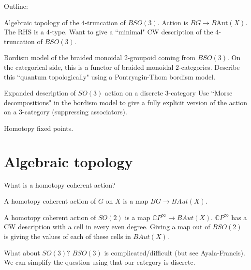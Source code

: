 \documentclass[beamer]{beamer}
\begin{document}
\begin{frame}{Outline:}
\begin{block}{Algebraic topology of the $4$-truncation of $BSO(3)$.}
Action is $BG \rightarrow B \mathrm{Aut}(X)$.  The RHS is a $4$-type.  Want to give a ``minimal" CW description of the $4$-truncation of $BSO(3)$.
\end{block}

\begin{block}{Bordism model of the braided monoidal $2$-groupoid coming from $BSO(3)$.}
On the categorical side, this is a functor of braided monoidal $2$-categories.  Describe this ``quantum topologically" using a Pontryagin-Thom bordism model.
\end{block}

\begin{block}{Expanded description of $SO(3)$ action on a discrete $3$-category}
Use ``Morse decompositions" in the bordism model to give a fully explicit version of the action on a $3$-category (suppressing associators).
\end{block}

\begin{block}{Homotopy fixed points.}
\end{block}
\end{frame}

\section{Algebraic topology}

\begin{frame}{What is a homotopy coherent action?}
\begin{definition}
A homotopy coherent action of $G$ on $X$ is a map $BG \rightarrow BAut(X)$.
\end{definition}

\begin{example}
A homotopy coherent action of $SO(2)$ is a map $\mathbb{C}P^\infty \rightarrow BAut(X)$.  $\mathbb{C}P^\infty$ has a CW description with a cell in every even degree.  Giving a map out of $BSO(2)$ is giving the values of each of these cells in $BAut(X)$.
\end{example}

\begin{block}{What about $SO(3)$?}
$BSO(3)$ is complicated/difficult (but see Ayala-Francis).  We can simplify the question using that our category is discrete.
\end{block}
\end{frame}
\end{document}
